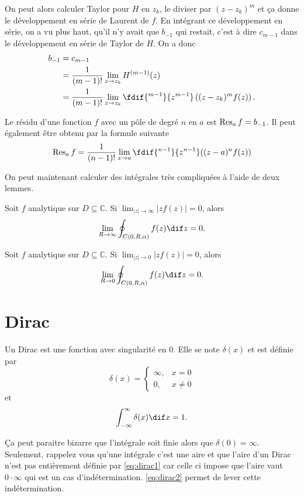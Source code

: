 On peut alors calculer Taylor pour $H$ en $z_k$,
le diviser par $(z-z_k)^m$ et ça donne le développement en série de Laurent
de $f$.
En intégrant ce développement en série, on a vu plus haut,
qu'il n'y avait que $b_{-1}$ qui restait,
c'est à dire $c_{m-1}$ dans le développement en série de Taylor de
$H$.
On a donc
\begin{align*}
  b_{-1} & = c_{m-1}\\
  & = \frac{1}{(m-1)!}\lim_{z\to z_k} H^{(m-1)}(z)\\
  & = \frac{1}{(m-1)!}\lim_{z\to z_k} \fdif{^{m-1}}{z^{m-1}}
  \left((z-z_k)^m f(z)\right).
\end{align*}

\begin{mydef}
  Le résidu d'une fonction $f$ avec un pôle de degré $n$ en $a$ est
  $\operatorname{Res}_a f = b_{-1}$.
  Il peut également être obtenu par la formule suivante
  \[ \res_a f = \frac{1}{(n-1)!} \lim_{z \to a}
  \fdif{^{n-1}}{z^{n-1}}((z-a)^nf(z)) \]
\end{mydef}

On peut maintenant calculer des intégrales très compliquées à l'aide de
deux lemmes.
\begin{mylem}
  Soit $f$ analytique sur $D \subseteq \mathbb{C}$.
  Si $\lim_{|z|\to\infty} |zf(z)| = 0$, alors
  \[ \lim_{R\to\infty} \oint_{C(0,R,\alpha)}f(z)\dif z = 0. \]
\end{mylem}
\begin{mylem}
  Soit $f$ analytique sur $D \subseteq \mathbb{C}$.
  Si $\lim_{|z|\to 0} |zf(z)| = 0$, alors
  \[ \lim_{R\to 0} \oint_{C(0,R,\alpha)}f(z)\dif z = 0. \]
\end{mylem}

\annexe
\section{Dirac}
\label{app:dirac}
Un Dirac est une fonction avec singularité en 0.
Elle se note $\delta(x)$ et est définie par
\begin{equation}
  \label{eq:dirac1}
  \delta(x) =
  \begin{cases}
    \infty, & x = 0\\
    0, & x \neq 0
  \end{cases}
\end{equation}
et
\begin{equation}
  \label{eq:dirac2}
  \int_{-\infty}^{\infty} \delta(x) \dif x = 1.
\end{equation}

Ça peut paraitre bizarre que l'intégrale soit finie alors que
$\delta(0) = \infty$.
Seulement, rappelez vous qu'une intégrale c'est une aire et que
l'aire d'un Dirac n'est pas entièrement définie par \eqref{eq:dirac1}
car celle ci impose que l'aire vaut $0 \cdot \infty$ qui est un cas
d'indétermination.
\eqref{eq:dirac2} permet de lever cette indétermination.

